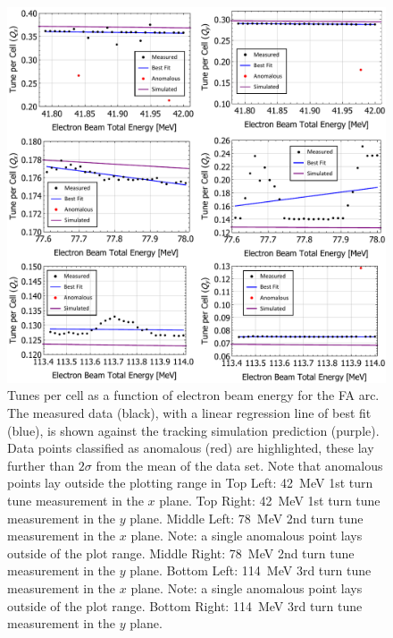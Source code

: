 \documentclass[../main.tex]{subfiles}
\begin{document}
\begin{figure}[!h]
\centering
\includegraphics[width=\textwidth]{Figures/CBETA_Multi-Pass_Commissioning/FA_analysed_3turn_tunes.pdf}
\caption{Tunes per cell as a function of electron beam energy for the FA arc. The measured data (black), with a linear regression line of best fit (blue), is shown against the tracking simulation prediction (purple). Data points classified as anomalous (red) are highlighted, these lay further than $2\sigma$ from the mean of the data set. Note that anomalous points lay outside the plotting range in  Top Left: 42~\si{\mega\electronvolt} 1st turn tune measurement in the $x$ plane. Top Right: 42~\si{\mega\electronvolt} 1st turn tune measurement in the $y$ plane. Middle Left: 78~\si{\mega\electronvolt} 2nd turn tune measurement in the $x$ plane. Note: a single anomalous point lays outside of the plot range. Middle Right: 78~\si{\mega\electronvolt} 2nd turn tune measurement in the $y$ plane. Bottom Left:  114~\si{\mega\electronvolt} 3rd turn tune measurement in the $x$ plane. Note: a single anomalous point lays outside of the plot range. Bottom Right: 114~\si{\mega\electronvolt} 3rd turn tune measurement in the $y$ plane.}
\label{fig:FA_analysed_tunes}
\end{figure}
\end{document}
